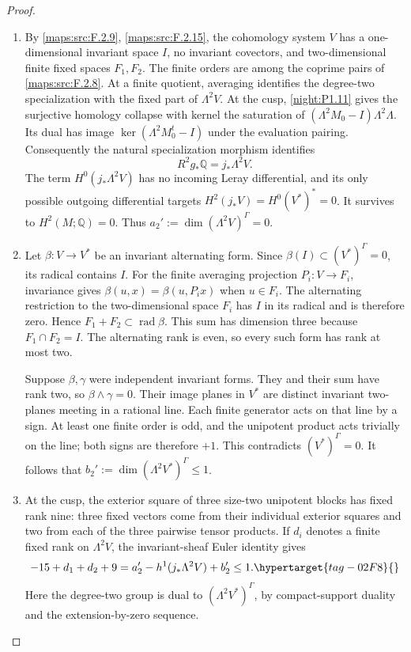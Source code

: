 \documentclass[11pt,a4paper]{article}
\numberwithin{equation}{section}
\theoremstyle{definition}
\begin{document}
\begin{proof}
\begin{enumerate}[label=\arabic*.]
\item By \cref{maps:src:F.2.9}, \cref{maps:src:F.2.15}, the cohomology
system $V$ has a one-dimensional invariant space $I$, no invariant
covectors, and two-dimensional finite fixed spaces $F_1,F_2$.
The finite orders are among the coprime pairs of
\cref{maps:src:F.2.8}.  At a finite quotient, averaging identifies
the degree-two specialization with the fixed part of $\Lambda^2V$.
At the cusp, \cref{night:P1.11} gives the surjective homology
collapse with kernel the saturation of
$(\Lambda^2M_0-I)\Lambda^2\Lambda$.  Its dual has image
$\ker(\Lambda^2M_0^t-I)$ under the evaluation pairing.  Consequently
the natural specialization morphism identifies
\[
 R^2g_*\mathbb Q=j_*\Lambda^2V.
\]
The term $H^0(j_*\Lambda^2V)$ has no incoming Leray differential,
and its only possible outgoing differential targets
$H^2(j_*V)=H^0(V^*)^*=0$.  It survives to $H^2(M;\mathbb Q)=0$.
Thus $a_2':=\dim(\Lambda^2V)^\Gamma=0$.

\item Let $\beta:V\to V^*$ be an invariant alternating form.
Since $\beta(I)\subset(V^*)^\Gamma=0$, its radical contains $I$.
For the finite averaging projection $P_i:V\to F_i$, invariance gives
$\beta(u,x)=\beta(u,P_ix)$ when $u\in F_i$.
The alternating restriction to the two-dimensional space $F_i$
has $I$ in its radical and is therefore zero.  Hence
$F_1+F_2\subset\operatorname{rad}\beta$.  This sum has dimension
three because $F_1\cap F_2=I$.  The alternating rank is even,
so every such form has rank at most two.

Suppose $\beta,\gamma$ were independent invariant forms.
They and their sum have rank two, so
$\beta\wedge\gamma=0$.  Their image planes in $V^*$
are distinct invariant two-planes meeting in a rational line.
Each finite generator acts on that line by a sign.  At least one
finite order is odd, and the unipotent product acts trivially on the
line; both signs are therefore $+1$.  This contradicts
$(V^*)^\Gamma=0$.  It follows that
$b_2':=\dim(\Lambda^2V^*)^\Gamma\leq1$.

\item At the cusp, the exterior square of three size-two unipotent
blocks has fixed rank nine: three fixed vectors come from their
individual exterior squares and two from each of the three pairwise
tensor products.  If $d_i$ denotes a finite fixed rank on
$\Lambda^2V$, the invariant-sheaf Euler identity gives
\begin{equation}
 -15+d_1+d_2+9
 =a_2'-h^1(j_*\Lambda^2V)+b_2'\leq1.
 \hypertarget{tag-02F8}{}\label{maps:eq:F.40}
\end{equation}
Here the degree-two group is dual to
$(\Lambda^2V^*)^\Gamma$, by compact-support duality and the
extension-by-zero sequence.


\end{enumerate}
\end{proof}
\end{document}
